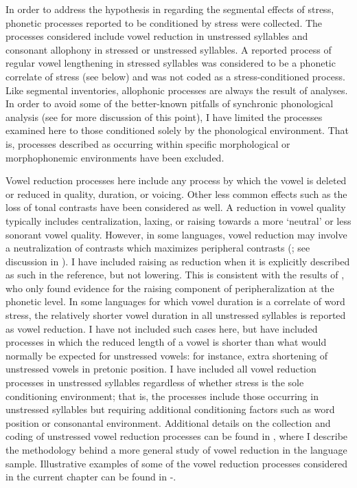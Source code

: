   In order to address the hypothesis in  regarding the segmental effects of stress, phonetic processes reported to be conditioned by stress were collected. The processes considered include vowel reduction in unstressed syllables and consonant allophony in stressed or unstressed syllables. A reported process of regular vowel lengthening in stressed syllables was considered to be a phonetic correlate of stress (see below) and was not coded as a stress-conditioned process. Like segmental inventories, allophonic processes are always the result of analyses. In order to avoid some of the better-known pitfalls of synchronic phonological analysis (see  for more discussion of this point), I have limited the processes examined here to those conditioned solely by the phonological environment. That is, processes described as occurring within specific morphological or morphophonemic environments have been excluded.

  Vowel reduction processes here include any process by which the vowel is deleted or reduced in quality, duration, or voicing. Other less common effects such as the loss of tonal contrasts have been considered as well. A reduction in vowel quality typically includes centralization, laxing, or raising towards a more ‘neutral’ or less sonorant vowel quality. However, in some languages, vowel reduction may involve a neutralization of contrasts which maximizes peripheral contrasts (\citealt{Crosswhite2001}; see discussion in ). I have included raising as reduction when it is explicitly described as such in the reference, but not lowering. This is consistent with the results of \citet{KapatsinskiEtAl2019}, who only found evidence for the raising component of peripheralization at the phonetic level. In some languages for which vowel duration is a correlate of word stress, the relatively shorter vowel duration in all unstressed syllables is reported as vowel reduction. I have not included such cases here, but have included processes in which the reduced length of a vowel is shorter than what would normally be expected for unstressed vowels: for instance, extra shortening of unstressed vowels in pretonic position. I have included all vowel reduction processes in unstressed syllables regardless of whether stress is the sole conditioning environment; that is, the processes include those occurring in unstressed syllables but requiring additional conditioning factors such as word position or consonantal environment. Additional details on the collection and coding of unstressed vowel reduction processes can be found in , where I describe the methodology behind a more general study of vowel reduction in the language sample. Illustrative examples of some of the vowel reduction processes considered in the current chapter can be found in -.

